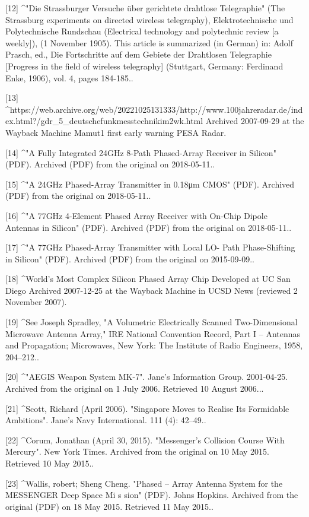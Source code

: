 [12]
^"Die Strassburger Versuche über gerichtete drahtlose Telegraphie" (The Strassburg experiments on directed wireless telegraphy), Elektrotechnische und Polytechnische Rundschau (Electrical technology and polytechnic review [a weekly]), (1 November 1905). This article is summarized (in German) in: Adolf Prasch, ed., Die Fortschritte auf dem Gebiete der Drahtlosen Telegraphie [Progress in the field of wireless telegraphy] (Stuttgart, Germany: Ferdinand Enke, 1906), vol. 4, pages 184-185..

[13]
^https://web.archive.org/web/20221025131333/http://www.100jahreradar.de/index.html?/gdr_5_deutschefunkmesstechnikim2wk.html Archived 2007-09-29 at the Wayback Machine Mamut1 first early warning PESA Radar.

[14]
^"A Fully Integrated 24GHz 8-Path Phased-Array Receiver in Silicon" (PDF). Archived (PDF) from the original on 2018-05-11..

[15]
^"A 24GHz Phased-Array Transmitter in 0.18μm CMOS" (PDF). Archived (PDF) from the original on 2018-05-11..

[16]
^"A 77GHz 4-Element Phased Array Receiver with On-Chip Dipole Antennas in Silicon" (PDF). Archived (PDF) from the original on 2018-05-11..

[17]
^"A 77GHz Phased-Array Transmitter with Local LO- Path Phase-Shifting in Silicon" (PDF). Archived (PDF) from the original on 2015-09-09..

[18]
^World’s Most Complex Silicon Phased Array Chip Developed at UC San Diego Archived 2007-12-25 at the Wayback Machine in UCSD News (reviewed 2 November 2007).

[19]
^See Joseph Spradley, "A Volumetric Electrically Scanned Two-Dimensional Microwave Antenna Array," IRE National Convention Record, Part I – Antennas and Propagation; Microwaves, New York: The Institute of Radio Engineers, 1958, 204–212..

[20]
^"AEGIS Weapon System MK-7". Jane's Information Group. 2001-04-25. Archived from the original on 1 July 2006. Retrieved 10 August 2006...

[21]
^Scott, Richard (April 2006). "Singapore Moves to Realise Its Formidable Ambitions". Jane's Navy International. 111 (4): 42–49..

[22]
^Corum, Jonathan (April 30, 2015). "Messenger's Collision Course With Mercury". New York Times. Archived from the original on 10 May 2015. Retrieved 10 May 2015..

[23]
^Wallis, robert; Sheng Cheng. "Phased – Array Antenna System for the MESSENGER Deep Space Mi s sion" (PDF). Johns Hopkins. Archived from the original (PDF) on 18 May 2015. Retrieved 11 May 2015..

